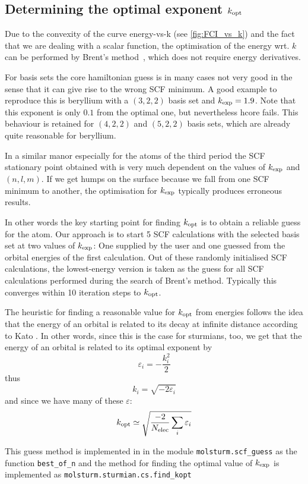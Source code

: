 \subsection{Determining the optimal exponent $k_\text{opt}$}
Due to the convexity of the curve energy-vs-k (see \vref{fig:FCI_vs_k})
and the fact that we are dealing with a scalar function,
the optimisation of the energy wrt. $k$ can be performed by
Brent's method~\cite{Brent1972},
which does not require energy derivatives.

For \CS basis sets the core hamiltonian guess is in many cases not very good
in the sense that it can give rise to the wrong SCF minimum.
A good example to reproduce this is beryllium with a $(3, 2, 2)$ \CS basis
set and $k_\text{exp} = 1.9$.
Note that this exponent is only $0.1$ from the optimal one,
but nevertheless hcore fails.
This behaviour is retained for $(4,2,2)$ and $(5,2,2)$ basis sets,
which are already quite reasonable for beryllium.

In a similar manor especially for the atoms of the third
period the SCF stationary point obtained with \molsturm
is very much dependent on the values of $k_\text{exp}$ and $(n,l,m)$.
If we get humps on the surface because we fall from one SCF
minimum to another,
the optimisation for $k_\text{exp}$ typically produces erroneous results.

In other words the key starting point for finding $k_\text{opt}$
is to obtain a reliable guess for the atom.
Our approach is to start 5 SCF calculations with the
selected \CS basis set at two values of $k_\text{exp}$:
One supplied by the user and one guessed from the \HF orbital
energies of the first calculation.
Out of these randomly initialised SCF calculations,
the lowest-energy version is taken as the guess
for all SCF calculations performed during the search
of Brent's method.
Typically this converges within 10 iteration steps
to $k_\text{opt}$.

The heuristic for finding a reasonable value for
$k_\text{opt}$ from \HF energies follows the idea that the
energy of an orbital is related to its decay at infinite distance
according to Kato
.
In other words, since this is the case for sturmians, too,
we get that the energy of an orbital is related to its optimal
exponent by
\[
	\varepsilon_i = -\frac{k_i^2}{2}
\]
thus
\[
	k_i = \sqrt{-2 \varepsilon_i}
\]
and since we have many of these $\varepsilon$:
\[
	k_\text{opt} \simeq \sqrt{\frac{-2}{N_\text{elec}} \sum_i \varepsilon_i}
\]

This guess method is implemented in \molsturm in the
module \texttt{molsturm.scf\_guess}
as the function \texttt{best\_of\_n} and the method
for finding the optimal value of $k_\text{exp}$ is implemented
as \texttt{molsturm.sturmian.cs.find\_kopt}

